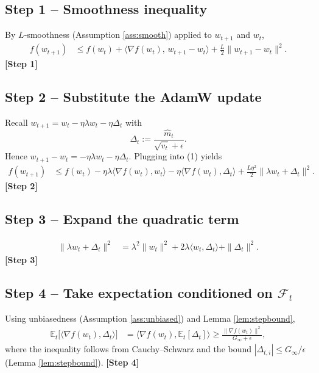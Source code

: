 \documentclass[11pt]{article}
\newcommand{\E}{\mathbb{E}}
\begin{document}
\subsection*{Step 1 – Smoothness inequality}
By $L$‑smoothness (Assumption \ref{ass:smooth}) applied to $w_{t+1}$ and $w_{t}$,
\begin{align}
f(w_{t+1})
&\le f(w_{t})+\langle\nabla f(w_{t}),\,w_{t+1}-w_{t}\rangle
+\frac{L}{2}\|w_{t+1}-w_{t}\|^{2}. \tag{1}
\end{align}
\textbf{[Step 1]}

\subsection*{Step 2 – Substitute the AdamW update}
Recall $w_{t+1}=w_{t}-\eta\lambda w_{t}-\eta\Delta_{t}$ with 
\[
\Delta_{t}:=\frac{\hat m_{t}}{\sqrt{\hat v_{t}}+\epsilon}.
\]
Hence $w_{t+1}-w_{t}= -\eta\lambda w_{t}-\eta\Delta_{t}$.
Plugging into (1) yields
\begin{align}
f(w_{t+1})
&\le f(w_{t})-\eta\lambda\langle\nabla f(w_{t}),w_{t}\rangle
-\eta\langle\nabla f(w_{t}),\Delta_{t}\rangle
+\frac{L\eta^{2}}{2}\|\lambda w_{t}+\Delta_{t}\|^{2}. \tag{2}
\end{align}
\textbf{[Step 2]}

\subsection*{Step 3 – Expand the quadratic term}
\begin{align}
\|\lambda w_{t}+\Delta_{t}\|^{2}
&=\lambda^{2}\|w_{t}\|^{2}+2\lambda\langle w_{t},\Delta_{t}\rangle+\|\Delta_{t}\|^{2}. \tag{3}
\end{align}
\textbf{[Step 3]}

\subsection*{Step 4 – Take expectation conditioned on $\mathcal{F}_{t}$}
Using unbiasedness (Assumption \ref{ass:unbiased}) and Lemma \ref{lem:stepbound},
\begin{align}
\E_{t}\!\bigl[\langle\nabla f(w_{t}),\Delta_{t}\rangle\bigr]
&=\bigl\langle\nabla f(w_{t}),\E_{t}[\Delta_{t}]\bigr\rangle
\ge \frac{\|\nabla f(w_{t})\|^{2}}{G_{\infty}+\epsilon}, \tag{4}
\end{align}
where the inequality follows from Cauchy–Schwarz and the bound
$|\Delta_{t,i}|\le G_{\infty}/\epsilon$ (Lemma \ref{lem:stepbound}).
\textbf{[Step 4]}
\end{document}
